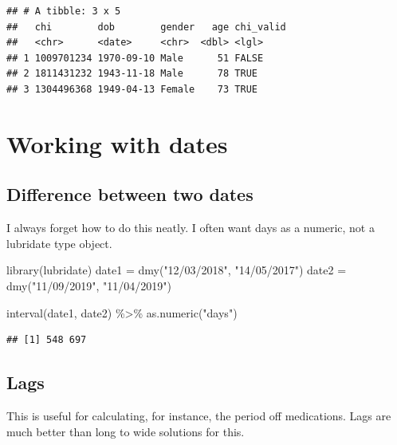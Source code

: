 \documentclass[
]{book}
\newenvironment{Shaded}{\begin{snugshade}}{\end{snugshade}}
\newcommand{\FunctionTok}[1]{\textcolor[rgb]{0.00,0.00,0.00}{#1}}
\newcommand{\NormalTok}[1]{#1}
\newcommand{\OtherTok}[1]{\textcolor[rgb]{0.56,0.35,0.01}{#1}}
\newcommand{\SpecialCharTok}[1]{\textcolor[rgb]{0.00,0.00,0.00}{#1}}
\newcommand{\StringTok}[1]{\textcolor[rgb]{0.31,0.60,0.02}{#1}}
\begin{document}
\begin{verbatim}
## # A tibble: 3 x 5
##   chi        dob        gender   age chi_valid
##   <chr>      <date>     <chr>  <dbl> <lgl>    
## 1 1009701234 1970-09-10 Male      51 FALSE    
## 2 1811431232 1943-11-18 Male      78 TRUE     
## 3 1304496368 1949-04-13 Female    73 TRUE
\end{verbatim}

\hypertarget{working-with-dates}{%
\section{Working with dates}\label{working-with-dates}}

\hypertarget{difference-between-two-dates}{%
\subsection{Difference between two dates}\label{difference-between-two-dates}}

I always forget how to do this neatly.
I often want days as a numeric, not a lubridate type object.

\begin{Shaded}
\begin{Highlighting}[]
\FunctionTok{library}\NormalTok{(lubridate)}
\NormalTok{date1 }\OtherTok{=} \FunctionTok{dmy}\NormalTok{(}\StringTok{"12/03/2018"}\NormalTok{, }\StringTok{"14/05/2017"}\NormalTok{)}
\NormalTok{date2 }\OtherTok{=} \FunctionTok{dmy}\NormalTok{(}\StringTok{"11/09/2019"}\NormalTok{, }\StringTok{"11/04/2019"}\NormalTok{)}

\FunctionTok{interval}\NormalTok{(date1, date2) }\SpecialCharTok{\%\textgreater{}\%} 
  \FunctionTok{as.numeric}\NormalTok{(}\StringTok{"days"}\NormalTok{)}
\end{Highlighting}
\end{Shaded}

\begin{verbatim}
## [1] 548 697
\end{verbatim}

\hypertarget{lags}{%
\subsection{Lags}\label{lags}}

This is useful for calculating, for instance, the period off medications. Lags are much better than long to wide solutions for this.
\end{document}
